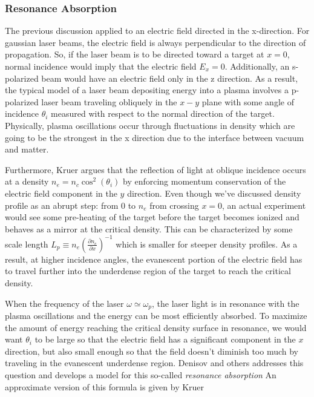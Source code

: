 \subsubsection{Resonance Absorption}
The previous discussion applied to an electric field directed in the x-direction. For gaussian laser beams, the electric field is always perpendicular to the direction of propagation. So, if the laser beam is to be directed toward a target at $x = 0$, normal incidence would imply that the electric field $E_x = 0$. Additionally, an s-polarized beam would have an electric field only in the z direction. As a result, the typical model of a laser beam depositing energy into a plasma involves a p-polarized laser beam traveling obliquely in the $x-y$ plane with some angle of incidence $\theta_i$ measured with respect to the normal direction of the target. Physically, plasma oscillations occur through fluctuations in density which are going to be the strongest in the x direction due to the interface between vacuum and matter.

Furthermore, Kruer \cite{Kruer_2003_Plasma} argues that the reflection of light at oblique incidence occurs at a density $n_e = n_c \cos^2(\theta_i)$ by enforcing momentum conservation of the electric field component in the $y$ direction. Even though we've discussed density profile as an abrupt step: from 0 to $n_e$ from crossing $x = 0$, an actual experiment would see some pre-heating of the target before the target becomes ionized and behaves as a mirror at the critical density. This can be characterized by some scale length $L_p \equiv n_e (\frac{\partial n_e}{\partial x})^{-1}$ which is smaller for steeper density profiles. As a result, at higher incidence angles, the evanescent portion of the electric field has to travel further into the underdense region of the target to reach the critical density. 

When the frequency of the laser $\omega \simeq \omega_p$, the laser light is in resonance with the plasma oscillations and the energy can be most efficiently absorbed. To maximize the amount of energy reaching the critical density surface in resonance, we would want $\theta_i$ to be large so that the electric field has a significant component in the $x$ direction, but also small enough so that the field doesn't diminish too much by traveling in the evanescent underdense region. Denisov \cite{Denisov_1957_JETP} and others \cite{Forslund_1975_PRA, Freidberg_1972_PRL, Estabrook_1975_PoF} addresses this question and develops a model for this so-called \emph{resonance absorption} An approximate version of this formula is given by Kruer \cite{Kruer_2003_Plasma}

